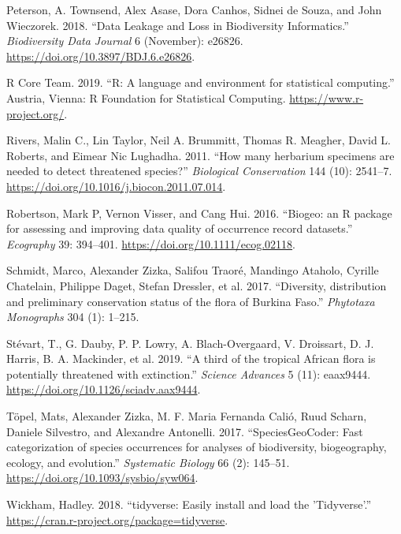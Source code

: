 \documentclass[fleqn,10pt,lineno]{wlpeerj} %
\begin{document}
\leavevmode\hypertarget{ref-Peterson2018}{}%
Peterson, A. Townsend, Alex Asase, Dora Canhos, Sidnei de Souza, and John Wieczorek. 2018. ``Data Leakage and Loss in Biodiversity Informatics.'' \emph{Biodiversity Data Journal} 6 (November): e26826. \url{https://doi.org/10.3897/BDJ.6.e26826}.

\leavevmode\hypertarget{ref-rcoreteam2019}{}%
R Core Team. 2019. ``R: A language and environment for statistical computing.'' Austria, Vienna: R Foundation for Statistical Computing. \url{https://www.r-project.org/}.

\leavevmode\hypertarget{ref-Rivers2011}{}%
Rivers, Malin C., Lin Taylor, Neil A. Brummitt, Thomas R. Meagher, David L. Roberts, and Eimear Nic Lughadha. 2011. ``How many herbarium specimens are needed to detect threatened species?'' \emph{Biological Conservation} 144 (10): 2541--7. \url{https://doi.org/10.1016/j.biocon.2011.07.014}.

\leavevmode\hypertarget{ref-Robertson2016}{}%
Robertson, Mark P, Vernon Visser, and Cang Hui. 2016. ``Biogeo: an R package for assessing and improving data quality of occurrence record datasets.'' \emph{Ecography} 39: 394--401. \url{https://doi.org/10.1111/ecog.02118}.

\leavevmode\hypertarget{ref-Schmidt2017}{}%
Schmidt, Marco, Alexander Zizka, Salifou Traoré, Mandingo Ataholo, Cyrille Chatelain, Philippe Daget, Stefan Dressler, et al. 2017. ``Diversity, distribution and preliminary conservation status of the flora of Burkina Faso.'' \emph{Phytotaxa Monographs} 304 (1): 1--215.

\leavevmode\hypertarget{ref-Stevart2019}{}%
Stévart, T., G. Dauby, P. P. Lowry, A. Blach-Overgaard, V. Droissart, D. J. Harris, B. A. Mackinder, et al. 2019. ``A third of the tropical African flora is potentially threatened with extinction.'' \emph{Science Advances} 5 (11): eaax9444. \url{https://doi.org/10.1126/sciadv.aax9444}.

\leavevmode\hypertarget{ref-Topel2017}{}%
Töpel, Mats, Alexander Zizka, M. F. Maria Fernanda Calió, Ruud Scharn, Daniele Silvestro, and Alexandre Antonelli. 2017. ``SpeciesGeoCoder: Fast categorization of species occurrences for analyses of biodiversity, biogeography, ecology, and evolution.'' \emph{Systematic Biology} 66 (2): 145--51. \url{https://doi.org/10.1093/sysbio/syw064}.

\leavevmode\hypertarget{ref-Wickham2018}{}%
Wickham, Hadley. 2018. ``tidyverse: Easily install and load the 'Tidyverse'.'' \url{https://cran.r-project.org/package=tidyverse}.
\end{document}

